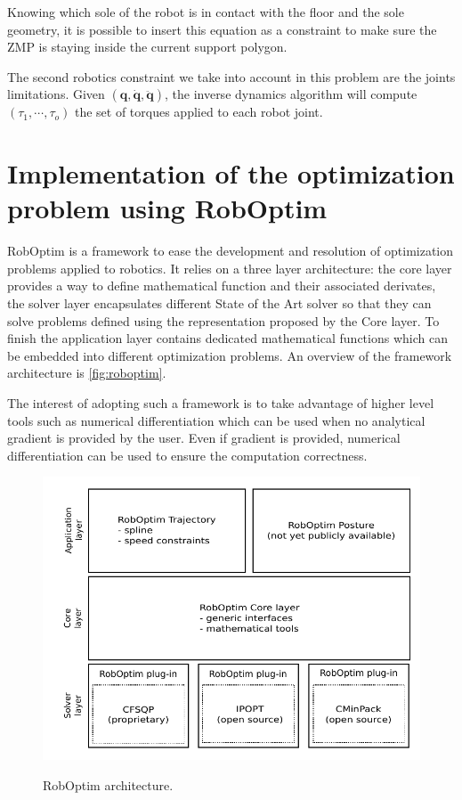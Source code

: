 \documentclass[letterpaper, 10 pt, conference]{ieeeconf}  %
\begin{document}
Knowing which sole of the robot is in contact with the floor and the
sole geometry, it is possible to insert this equation as a constraint
to make sure the ZMP is staying inside the current support polygon.


The second robotics constraint we take into account in this problem
are the joints limitations. Given $(\mathbf{q}, \dot{\mathbf{q}},
\ddot{\mathbf{q}})$, the inverse dynamics algorithm \cite{FIXME} will
compute $(\tau_1, \cdots, \tau_o)$ the set of torques applied to each
robot joint.


\section{Implementation of the optimization problem using RobOptim}
\label{sec:implementation}


RobOptim is a framework to ease the development and resolution of
optimization problems applied to robotics. It relies on a three layer
architecture: the core layer provides a way to define mathematical
function and their associated derivates, the solver layer encapsulates
different State of the Art solver so that they can solve problems
defined using the representation proposed by the Core layer. To finish
the application layer contains dedicated mathematical functions which
can be embedded into different optimization problems. An overview of
the framework architecture is \autoref{fig:roboptim}.


The interest of adopting such a framework is to take advantage of
higher level tools such as numerical differentiation which can be used
when no analytical gradient is provided by the user. Even if gradient
is provided, numerical differentiation can be used to ensure the
computation correctness.


\begin{figure}[htbp!]
  \includegraphics[width=\linewidth]{figure/roboptim-architecture.pdf}
  \label{fig:roboptim}
  \caption{RobOptim  architecture.}
\end{figure}
\end{document}

